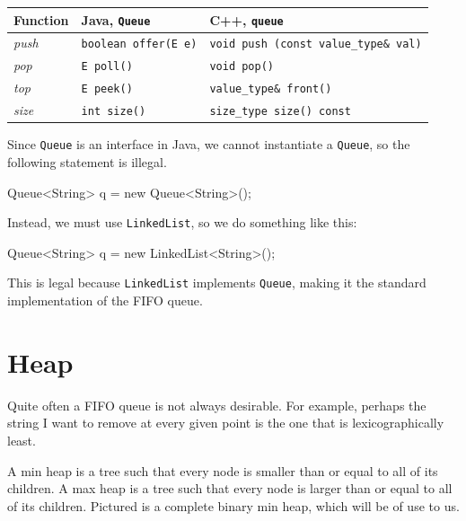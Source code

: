 \begin{center}
    \begin{tabular}{ p{5cm} p{5cm} p{5cm} }
	Function	&	Java, \texttt{Queue}	&	C++, \texttt{queue} \\
	\hline
	\textit{push}		&	\texttt{boolean offer(E e)}	&	\texttt{void push (const value\_type\& val)} \\
    \textit{pop}			&	\texttt{E poll()}		&	\texttt{void pop()}	\\
    \textit{top}		&	\texttt{E peek()}		&	\texttt{value\_type\& front()}	\\
    \textit{size} & \texttt{int size()} & \texttt{size\_type size() const}
    \end{tabular}
\end{center}

Since \texttt{Queue} is an interface in Java, we cannot instantiate a \texttt{Queue}, so the following statement is illegal.

\begin{mylstlisting}
Queue<String> q = new Queue<String>();
\end{mylstlisting}

Instead, we must use \texttt{LinkedList}, so we do something like this:

\begin{mylstlisting}
Queue<String> q = new LinkedList<String>();
\end{mylstlisting}

This is legal because \texttt{LinkedList} implements \texttt{Queue}, making it the standard implementation of the FIFO queue.

\section{Heap}

Quite often a FIFO queue is not always desirable. For example, perhaps the string I want to remove at every given point is the one that is lexicographically least.

A min heap is a tree such that every node is smaller than or equal to all of its children. A max heap is a tree such that every node is larger than or equal to all of its children. Pictured is a complete binary min heap, which will be of use to us.

